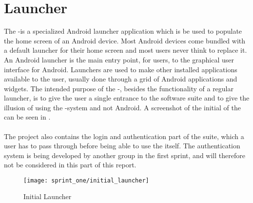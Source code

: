 
\section{Launcher}
The \giraf-\launcher is a specialized Android launcher application which is be used to populate the home screen of an Android device. Most Android devices come bundled with a default launcher for their home screen and most users never think to replace it. An Android launcher is the main entry point, for users, to the graphical user interface for Android. Launchers are used to make other installed applications available to the user, usually done through a grid of Android applications and widgets. The intended purpose of the \giraf-\launcher, besides the functionality of a regular launcher, is to give the user a single entrance to the \giraf software suite and to give the illusion of using the \giraf-system and not Android. A screenshot of the initial  of the \launcher can be seen in . 
\\\\
The \launcher project also contains the login and authentication part of the \giraf suite, which a user has to pass through before being able to use the \launcher itself. The authentication system is being developed by another group in the first sprint, and will therefore not be considered in this part of this report. 

\begin{figure}[!htbp]
	\centering
	\texttt{[image: sprint\_one/initial\_launcher]}
	\caption{Initial Launcher}
	\label{fig:initial_launcher}
\end{figure}
